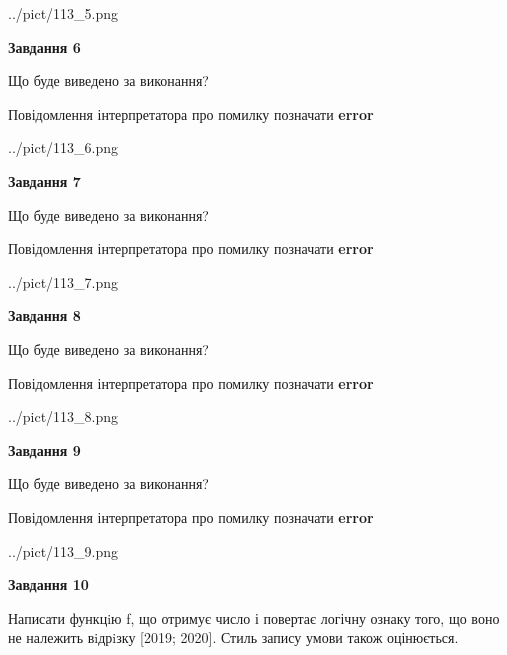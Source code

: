 \documentclass[12pt, ukrainian]{article}
\begin{document}
{\begin {large}
\begin{center}
	{../pict/113_5.png}
\end{center}
\newpage

{\begin {center}\textbf{Завдання 6}\end {center}}\par
Що буде виведено за виконання? \par
Повідомлення інтерпретатора про помилку позначати \textbf{error}

\begin{center}
	{../pict/113_6.png}
\end{center}
\newpage

{\begin {center}\textbf{Завдання 7}\end {center}}\par
Що буде виведено за виконання? \par
Повідомлення інтерпретатора про помилку позначати \textbf{error}

\begin{center}
	{../pict/113_7.png}
\end{center}
\newpage

{\begin {center}\textbf{Завдання 8}\end {center}}\par
Що буде виведено за виконання? \par
Повідомлення інтерпретатора про помилку позначати \textbf{error}

\begin{center}
	{../pict/113_8.png}
\end{center}
\newpage

{\begin {center}\textbf{Завдання 9}\end {center}}\par
Що буде виведено за виконання? \par
Повідомлення інтерпретатора про помилку позначати \textbf{error}

\begin{center}
	{../pict/113_9.png}
\end{center}
\newpage

{\begin {center}\textbf{Завдання 10}\end {center}}\par

Написати функцiю f, що отримує число і повертає логічну ознаку того, що воно не належить вiдрiзку [2019; 2020]. Стиль запису умови також оцінюється.\par
\newpage

\end {large}}
\end{document}
